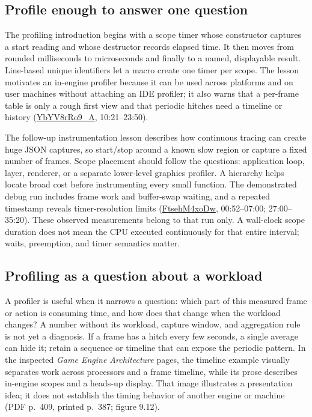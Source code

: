 \subsection{Profile enough to answer one question}\label{06-engine-ii-ch041-profile-enough-to-answer-one-question}

\hypertarget{06-engine-ii-ch041-profile-enough-to-answer-one-question}{}

The profiling introduction begins with a scope timer whose constructor captures a start reading and whose destructor records elapsed time. It then moves from rounded milliseconds to microseconds and finally to a named, displayable result. Line-based unique identifiers let a macro create one timer per scope. The lesson motivates an in-engine profiler because it can be used across platforms and on user machines without attaching an IDE profiler; it also warns that a per-frame table is only a rough first view and that periodic hitches need a timeline or history (\href{https://www.youtube.com/watch?v=YbYV8rRo9_A}{YbYV8rRo9\_A}, 10:21--23:50).

The follow-up instrumentation lesson describes how continuous tracing can create huge JSON captures, so start/stop around a known slow region or capture a fixed number of frames. Scope placement should follow the questions: application loop, layer, renderer, or a separate lower-level graphics profiler. A hierarchy helps locate broad cost before instrumenting every small function. The demonstrated debug run includes frame work and buffer-swap waiting, and a repeated timestamp reveals timer-resolution limits (\href{https://www.youtube.com/watch?v=FtsehM4xoDw}{FtsehM4xoDw}, 00:52--07:00; 27:00--35:20). These observed measurements belong to that run only. A wall-clock scope duration does not mean the CPU executed continuously for that entire interval; waits, preemption, and timer semantics matter.

\subsection{Profiling as a question about a workload}\label{06-engine-ii-ch041-profiling-as-a-question-about-a-workload}

\hypertarget{06-engine-ii-ch041-profiling-as-a-question-about-a-workload}{}

A profiler is useful when it narrows a question: which part of this measured frame or action is consuming time, and how does that change when the workload changes? A number without its workload, capture window, and aggregation rule is not yet a diagnosis. If a frame has a hitch every few seconds, a single average can hide it; retain a sequence or timeline that can expose the periodic pattern. In the inspected \emph{Game Engine Architecture} pages, the timeline example visually separates work across processors and a frame timeline, while its prose describes in-engine scopes and a heads-up display. That image illustrates a presentation idea; it does not establish the timing behavior of another engine or machine (PDF p.~409, printed p.~387; figure 9.12).

